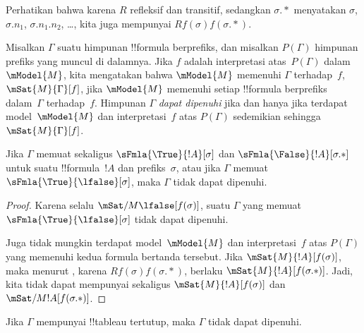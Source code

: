 \documentclass[../../../include/open-logic-section]{subfiles}
\begin{document}
Perhatikan bahwa karena $R$ refleksif dan transitif, sedangkan $\sigma.{*}$
menyatakan $\sigma$, $\sigma.n_1$, $\sigma.n_1.n_2$, \dots, kita juga
mempunyai $Rf(\sigma)f(\sigma.{*})$.

\begin{defn}
  Misalkan $\Gamma$ suatu himpunan !!{formula} berprefiks, dan misalkan
  $P(\Gamma)$ himpunan prefiks yang muncul di dalamnya. Jika $f$ adalah
  interpretasi atas~$P(\Gamma)$ dalam $\mModel{M}$, kita mengatakan bahwa
  $\mModel{M}$ memenuhi $\Gamma$ terhadap~$f$,
  $\mSat{M}{\Gamma}[f]$, jika $\mModel{M}$ memenuhi setiap !!{formula}
  berprefiks dalam~$\Gamma$ terhadap~$f$. Himpunan $\Gamma$ \emph{dapat
  dipenuhi} jika dan hanya jika terdapat model~$\mModel{M}$ dan
  interpretasi~$f$ atas $P(\Gamma)$ sedemikian sehingga
  $\mSat{M}{\Gamma}[f]$.
\end{defn}

\begin{prop}
  Jika $\Gamma$ memuat sekaligus $\sFmla{\True}{!A}[\sigma]$ dan
  $\sFmla{\False}{!A}[\sigma.{*}]$ untuk suatu !!{formula}~$!A$ dan
  prefiks~$\sigma$, atau jika $\Gamma$ memuat
  $\sFmla{\True}{\lfalse}[\sigma]$, maka $\Gamma$ tidak dapat dipenuhi.
\end{prop}

\begin{proof}
  Karena selalu $\mSat/{M}{\lfalse}[f(\sigma)]$, suatu $\Gamma$ yang memuat
  $\sFmla{\True}{\lfalse}[\sigma]$ tidak dapat dipenuhi.

  Juga tidak mungkin terdapat model~$\mModel{M}$ dan interpretasi~$f$ atas
  $P(\Gamma)$ yang memenuhi kedua formula bertanda tersebut. Jika
  $\mSat{M}{!A}[f(\sigma)]$, maka menurut
  , karena
  $Rf(\sigma)f(\sigma.{*})$, berlaku
  $\mSat{M}{!A}[f(\sigma.{*})]$. Jadi, kita tidak dapat mempunyai sekaligus
  $\mSat{M}{!A}[f(\sigma)]$ dan $\mSat/{M}{!A}[f(\sigma.{*})]$.
\end{proof}

\begin{thm}[Kesahihan]
  Jika $\Gamma$ mempunyai !!{tableau} tertutup, maka $\Gamma$ tidak dapat
  dipenuhi.
\end{thm}
\end{document}
